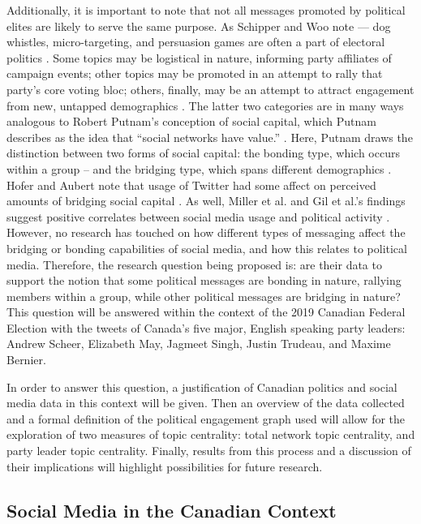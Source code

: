 Additionally, it is important to note that not all messages promoted by
political elites are likely to serve the same purpose. As Schipper and Woo note
— dog whistles, micro-targeting, and persuasion games are often a part of
electoral politics \cite{schipper2018political}. Some topics may be logistical
in nature, informing party affiliates of campaign events; other topics may be
promoted in an attempt to rally that party's core voting bloc; others, finally,
may be an attempt to attract engagement from new, untapped demographics
\cite{shah2007campaign}. The latter two categories are in many ways analogous to
Robert Putnam's conception of social capital, which Putnam describes as the idea
that ``social networks have value.'' \cite{putnam2000bowling}. Here, Putnam
draws the distinction between two forms of social capital: the bonding type,
which occurs within a group -- and the bridging type, which spans different
demographics \cite{putnam2000bowling}. Hofer and Aubert note that usage of
Twitter had some affect on perceived amounts of bridging social capital
\cite{hofer2013perceived}. As well, Miller et al. and Gil et al.'s findings
suggest positive correlates between social media usage and political activity
\cite{miller2015talking,gil2012social}. However, no research has touched on how
different types of messaging affect the bridging or bonding capabilities of
social media, and how this relates to political media. Therefore, the research
question being proposed is: are their data to support the notion that some
political messages are bonding in nature, rallying members within a group, while
other political messages are bridging in nature? This question will be answered
within the context of the 2019 Canadian Federal Election with the tweets of
Canada’s five major, English speaking party leaders: Andrew Scheer, Elizabeth
May, Jagmeet Singh, Justin Trudeau, and Maxime Bernier.


In order to answer this question, a justification of Canadian politics and
social media data in this context will be given. Then an overview of the data
collected and a formal definition of the political engagement graph used will
allow for the exploration of two measures of topic centrality: total network
topic centrality, and party leader topic centrality. Finally, results from this
process and a discussion of their implications will highlight possibilities for
future research.  

\subsection{Social Media in the Canadian Context}

